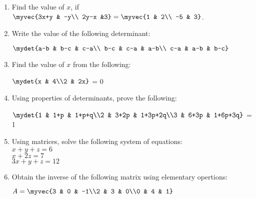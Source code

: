 \begin{enumerate}
	\item Find the value of $x$, if \\
		$\myvec{3x+y & -y\\ 2y-x &3} = \myvec{1 & 2\\ -5 & 3}$.
	\item Write the value of the following determinant:\\
		\centerline{$\mydet{a-b & b-c & c-a\\ b-c & c-a & a-b\\ c-a & a-b & b-c}$}
	\item Find the value of $x$ from the following:\\
		\centerline{$\mydet{x & 4\\2 & 2x}$ = 0}
	\item Using properties of determinants, prove the following:\\
		\centerline{$\mydet{1 & 1+p & 1+p+q\\2 & 3+2p & 1+3p+2q\\3 & 6+3p & 1+6p+3q}$ = 1}
	\item Using matrices, solve the following system of equations:\\
		$x+y+z = 6$\\
		$x+2z = 7$\\
		$3x+y+z = 12$
	\item Obtain the inverse of the following matrix using elementary opertions:\\
		\centerline{$A = \myvec{3 & 0 & -1\\2 & 3 & 0\\0 & 4 & 1}$}
\end{enumerate}

